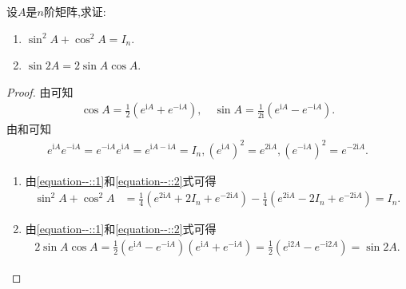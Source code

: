 \documentclass[../../main.tex]{subfiles}%
\begin{document}
\begin{proposition}[矩阵三角函数的性质]\label{proposition:矩阵三角函数的性质}
设$A$是$n$阶矩阵,求证:
\begin{enumerate}[(1)]
\item  $\sin^2 A+\cos^2 A = I_n$.

\item $\sin 2A = 2\sin A\cos A$.
\end{enumerate}
\end{proposition}
\begin{proof}

由可知
\begin{align}\label{equation--::1}
\cos A = \frac{1}{2}(e^{\mathrm{i}A}+e^{-\mathrm{i}A}),
\quad
\sin A = \frac{1}{2\mathrm{i}}(e^{\mathrm{i}A}-e^{-\mathrm{i}A}).
\end{align}
由和可知
\begin{align}\label{equation--::2}
e^{\mathrm{i}A}e^{-\mathrm{i}A}=e^{-\mathrm{i}A}e^{\mathrm{i}A}=e^{\mathrm{i}A - \mathrm{i}A}=I_n,(e^{\mathrm{i}A})^2 = e^{2\mathrm{i}A},(e^{-\mathrm{i}A})^2 = e^{-2\mathrm{i}A}.
\end{align}
\begin{enumerate}[(1)]
\item 由\eqref{equation--::1}和\eqref{equation--::2}式可得
\begin{align*}
\sin^2 A+\cos^2 A &= \frac{1}{4}(e^{2\mathrm{i}A}+2I_n + e^{-2\mathrm{i}A}) - \frac{1}{4}(e^{2\mathrm{i}A}-2I_n + e^{-2\mathrm{i}A}) = I_n.
\end{align*}

\item 由\eqref{equation--::1}和\eqref{equation--::2}式可得
\begin{align*}
2\sin A\cos A=\frac{1}{2}\left( e^{\mathrm{i}A}-e^{-\mathrm{i}A} \right) \left( e^{\mathrm{i}A}+e^{-\mathrm{i}A} \right) =\frac{1}{2}\left( e^{\mathrm{i}2A}-e^{-\mathrm{i}2A} \right) =\sin 2A.    
\end{align*}
\end{enumerate}

\end{proof}
\end{document}
